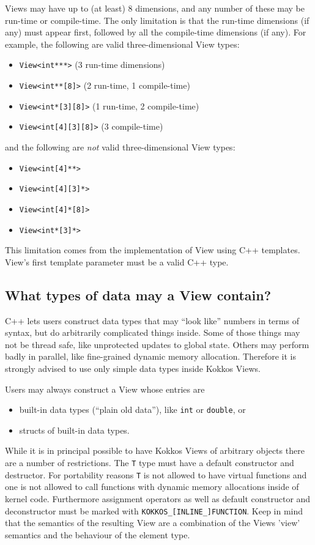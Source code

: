 Views may have up to (at least) 8 dimensions, and any number of these
may be run-time or compile-time.  The only limitation is that the
run-time dimensions (if any) must appear first, followed by all the
compile-time dimensions (if any).  For example, the following are
valid three-dimensional View types:
\begin{itemize}
\item \lstinline!View<int***>!  (3 run-time dimensions)
\item \lstinline!View<int**[8]>!  (2 run-time, 1 compile-time)
\item \lstinline!View<int*[3][8]>!  (1 run-time, 2 compile-time)
\item \lstinline!View<int[4][3][8]>!  (3 compile-time)
\end{itemize}
and the following are \emph{not} valid three-dimensional View types:
\begin{itemize}
\item \lstinline!View<int[4]**>!
\item \lstinline!View<int[4][3]*>!
\item \lstinline!View<int[4]*[8]>!
\item \lstinline!View<int*[3]*>!
\end{itemize}
This limitation comes from the implementation of View using C++
templates.  View's first template parameter must be a valid C++ type.

\subsection{What types of data may a View contain?}

C++ lets users construct data types that may ``look like'' numbers in
terms of syntax, but do arbitrarily complicated things inside.  Some
of those things may not be thread safe, like unprotected updates to
global state.  Others may perform badly in parallel, like fine-grained
dynamic memory allocation.  Therefore it is strongly advised to use 
only simple data types inside Kokkos Views.

Users may always construct a View whose entries are 
\begin{itemize}
\item built-in data types (``plain old data''), like \texttt{int} or
  \texttt{double}, or
\item structs of built-in data types.
\end{itemize}

While it is in principal possible to have Kokkos Views of arbitrary 
objects there are a number of restrictions. The \lstinline|T| type 
must have a default constructor and destructor. For portability reasons
\lstinline|T| is not allowed to have virtual functions and one is not 
allowed to call functions with dynamic memory allocations inside of 
kernel code. Furthermore assignment operators as well as default constructor
and deconstructor must be marked with \lstinline|KOKKOS_[INLINE_]FUNCTION|. 
Keep in mind that the semantics of the resulting View are a combination of the 
Views 'view' semantics and the behaviour of the element type.

